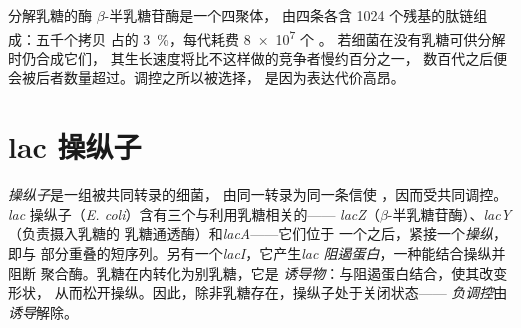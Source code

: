 \begin{example}[仅在需要时合成酶]\label{ex:b1:expression-control:economy}
分解乳糖的酶 $\beta$-半乳糖苷酶是一个四聚体，
由四条各含 \qty{1024}{} 个残基的肽链组成：五千个拷贝
占的 \qty{3}{\%}，每代耗费 \qty{8e7}{} 个 。
若细菌在没有乳糖可供分解时仍合成它们，
其生长速度将比不这样做的竞争者慢约百分之一，
数百代之后便会被后者数量超过。调控之所以被选择，
是因为表达代价高昂。
\end{example}

\section{lac 操纵子}

\begin{definition}\label{def:b1:expression-control:operon}
\emph{操纵子}是一组被共同转录的细菌，
由同一转录为同一条信使 ，因而受共同调控。
\emph{lac} 操纵子（\emph{E. coli}）含有三个与利用乳糖相关的——
\emph{lacZ}（$\beta$-半乳糖苷酶）、\emph{lacY}（负责摄入乳糖的
乳糖通透酶）和\emph{lacA}——它们位于
一个之后，紧接一个\emph{操纵}，即与
部分重叠的短序列。另有一个\emph{lacI}，它产生\emph{lac
阻遏蛋白}，一种能结合操纵并阻断
 聚合酶。乳糖在内转化为别乳糖，它是
\emph{诱导物}：与阻遏蛋白结合，使其改变形状，
从而松开操纵。因此，除非乳糖存在，操纵子处于关闭状态——
\emph{负调控}由\emph{诱导}解除。
\end{definition}

